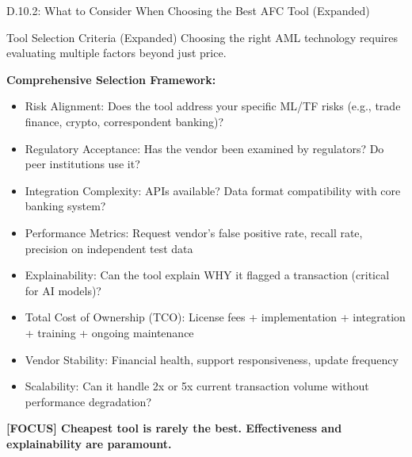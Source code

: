 \documentclass[11pt,a4paper]{beamer}
\newcommand{\examfocus}[1]{\textcolor{orange!80!black}{\textbf{[FOCUS] #1}}}
\begin{document}
\begin{frame}{D.10.2: What to Consider When Choosing the Best AFC Tool (Expanded)}
	\begin{block}{Tool Selection Criteria (Expanded)}
		Choosing the right AML technology requires evaluating multiple factors beyond just price.
	\end{block}
	\textbf{Comprehensive Selection Framework:}
	\begin{itemize}
		\item Risk Alignment: Does the tool address your specific ML/TF risks (e.g., trade finance, crypto, correspondent banking)?
		\item Regulatory Acceptance: Has the vendor been examined by regulators? Do peer institutions use it?
		\item Integration Complexity: APIs available? Data format compatibility with core banking system?
		\item Performance Metrics: Request vendor's false positive rate, recall rate, precision on independent test data
		\item Explainability: Can the tool explain WHY it flagged a transaction (critical for AI models)?
		\item Total Cost of Ownership (TCO): License fees + implementation + integration + training + ongoing maintenance
		\item Vendor Stability: Financial health, support responsiveness, update frequency
		\item Scalability: Can it handle 2x or 5x current transaction volume without performance degradation?
	\end{itemize}
	\examfocus{Cheapest tool is rarely the best. Effectiveness and explainability are paramount.}
\end{frame}
\end{document}
